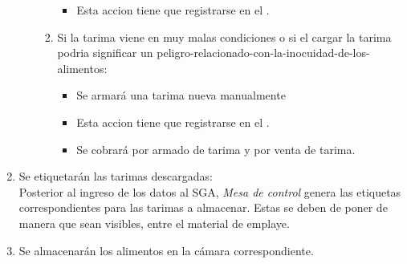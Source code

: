 \begin{enumerate}
\begin{enumerate}
\begin{enumerate}
\begin{itemize}
                    \item Esta accion tiene que registrarse en el \Oent.
                \end{itemize}
            \item Si la tarima viene en muy malas condiciones o si el cargar la tarima podria significar un \gls{peligro-relacionado-con-la-inocuidad-de-los-alimentos}:
                \begin{itemize}
                    \item Se armará una tarima nueva manualmente
                    \item Esta accion tiene que registrarse en el \Oent.
                    \item Se cobrará por armado de tarima y por venta de tarima.
                \end{itemize}
        \end{enumerate}
    \end{enumerate}
    \item Se etiquetarán las tarimas descargadas:\\
    Posterior al ingreso de los datos al \gls{SGA}, \emph{Mesa de control} genera las etiquetas correspondientes para las tarimas a almacenar. Estas se deben de poner de manera que sean visibles, entre el material de emplaye.
    \item Se almacenarán los alimentos en la cámara correspondiente.
\end{enumerate}

